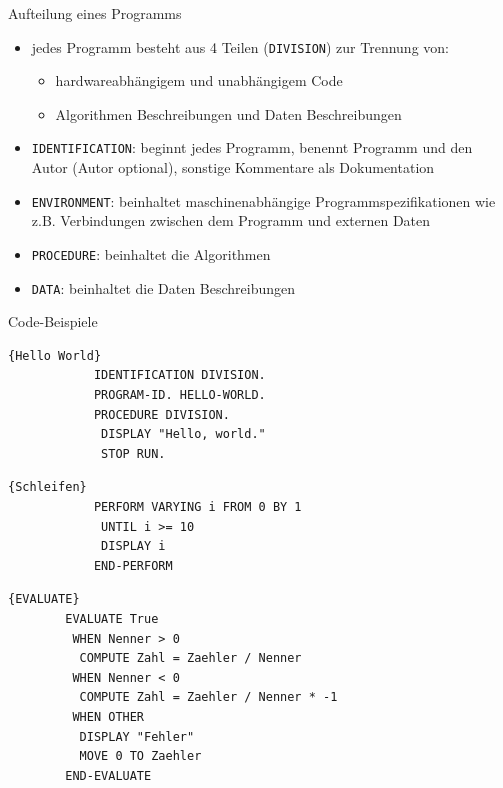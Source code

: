 \documentclass[handout]{beamer}
\begin{document}
\begin{frame}{Aufteilung eines Programms}
	\begin{itemize}[<+->]
		\item
			jedes Programm besteht aus 4 Teilen (\texttt{DIVISION}) zur Trennung von:
			\begin{itemize}[<+->]
			 	\item hardwareabh\"angigem und unabh\"angigem Code
				\item Algorithmen Beschreibungen und Daten Beschreibungen
			 \end{itemize}
		\item
			\texttt{IDENTIFICATION}: beginnt jedes Programm, benennt Programm und den Autor (Autor optional), sonstige Kommentare als Dokumentation
		\item
			\texttt{ENVIRONMENT}: beinhaltet maschinenabhängige Programmspezifikationen wie z.B. Verbindungen zwischen dem Programm und externen Daten
		\item
			\texttt{PROCEDURE}: beinhaltet die Algorithmen
		\item
			\texttt{DATA}: beinhaltet die Daten Beschreibungen
	\end{itemize}
\end{frame}

\def\beamertemplatetransparentcoveredmedium{}
\beamertemplatetransparentcoveredmedium
\begin{frame}[fragile]{Code-Beispiele}
	\onslide<1-1>
	\noindent\begin{minipage}{.44\textwidth}
		\begin{lstlisting}{Hello World}
			IDENTIFICATION DIVISION.
			PROGRAM-ID. HELLO-WORLD.
			PROCEDURE DIVISION.
			 DISPLAY "Hello, world."
			 STOP RUN.
		\end{lstlisting}
	\end{minipage}\hfill\pause
	\noindent\begin{minipage}{.53\textwidth}
		\begin{lstlisting}{Schleifen}
			PERFORM VARYING i FROM 0 BY 1
			 UNTIL i >= 10
			 DISPLAY i
			END-PERFORM
		\end{lstlisting}
	\end{minipage}\pause
	\lstset{numbers=left,firstnumber=1}
	\begin{lstlisting}{EVALUATE}
		EVALUATE True
		 WHEN Nenner > 0
		  COMPUTE Zahl = Zaehler / Nenner
		 WHEN Nenner < 0
		  COMPUTE Zahl = Zaehler / Nenner * -1
		 WHEN OTHER
		  DISPLAY "Fehler"
		  MOVE 0 TO Zaehler
		END-EVALUATE
	\end{lstlisting}
\end{frame}
\end{document}
